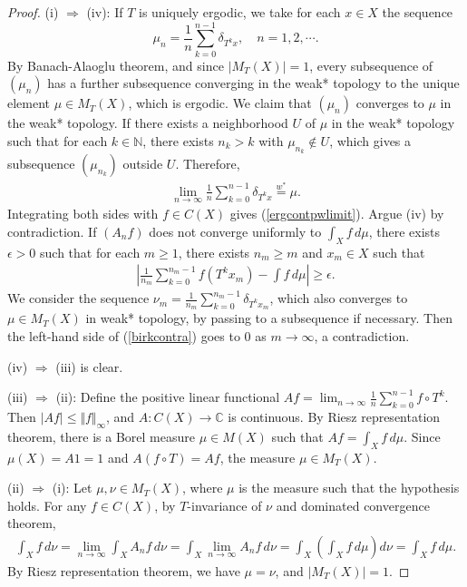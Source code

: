 \documentclass{article}
\numberwithin{equation}{section}
\newcommand{\bbC}{\mathbb{C}}
\newcommand{\bbN}{\mathbb{N}}
\theoremstyle{plain}
\theoremstyle{definition}
\begin{document}
\begin{proof}
(i) $\Rightarrow$ (iv): If $T$ is uniquely ergodic, we take for each $x\in X$ the sequence $$\mu_n=\frac{1}{n}\sum_{k=0}^{n-1}\delta_{T^kx},\quad n=1,2,\cdots.$$
By Banach-Alaoglu theorem, and since $\vert M_T(X)\vert=1$, every subsequence of $(\mu_n)$ has a further subsequence converging in the weak* topology to the unique element $\mu\in M_T(X)$, which is ergodic. We claim that $(\mu_n)$ converges to $\mu$ in the weak* topology. If there exists a neighborhood $U$ of $\mu$ in the weak* topology such that for each $k\in\bbN$, there exists $n_k>k$ with $\mu_{n_k}\notin U$, which gives a subsequence $(\mu_{n_k})$ outside $U$. Therefore,
\begin{align*}
\lim_{n\to\infty}\frac{1}{n}\sum_{k=0}^{n-1}\delta_{T^kx}\overset{w^*}{=}\mu.
\end{align*}
Integrating both sides with $f\in C(X)$ gives (\ref{ergcontpwlimit}). Argue (iv) by contradiction. If $(A_nf)$ does not converge uniformly to $\int_X f\,d\mu$, there exists $\epsilon>0$ such that for each $m\geq 1$, there exists $n_m\geq m$ and $x_m\in X$ such that
\begin{align}
	\left\vert\frac{1}{n_m}\sum_{k=0}^{n_m-1}f(T^kx_m)-\int f\,d\mu\right\vert\geq\epsilon.\label{birkcontra}
\end{align}
We consider the sequence $\nu_m=\frac{1}{n_m}\sum_{k=0}^{n_m-1}\delta_{T^k x_m}$, which also converges to $\mu\in M_T(X)$ in weak* topology, by passing to a subsequence if necessary. Then the left-hand side of (\ref{birkcontra}) goes to $0$ as $m\to\infty$, a contradiction.
\item (iv) $\Rightarrow$ (iii) is clear.
\item (iii) $\Rightarrow$ (ii): Define the positive linear functional $Af=\lim_{n\to\infty}\frac{1}{n}\sum_{k=0}^{n-1}f\circ T^k$. Then $\vert Af\vert\leq\Vert f\Vert_\infty$, and $A:C(X)\to\bbC$ is continuous. By Riesz representation theorem, there is a Borel measure $\mu\in M(X)$ such that $Af=\int_X f\,d\mu$. Since $\mu(X)=A1=1$ and $A(f\circ T)=Af$, the measure $\mu\in M_T(X)$.
\item (ii) $\Rightarrow$ (i): Let $\mu,\nu\in M_T(X)$, where $\mu$ is the measure such that the hypothesis holds. For any $f\in C(X)$, by $T$-invariance of $\nu$ and dominated convergence theorem, 
\begin{align}
	\int_X f\,d\nu=\lim_{n\to\infty}\int_X A_nf\,d\nu=\int_X\lim_{n\to\infty} A_nf\,d\nu=\int_X\left(\int_X f\,d\mu\right)d\nu=\int_X f\,d\mu.\label{birkchange}
\end{align}
By Riesz representation theorem, we have $\mu=\nu$, and $\vert M_T(X)\vert=1$.
\end{proof}
\end{document}
